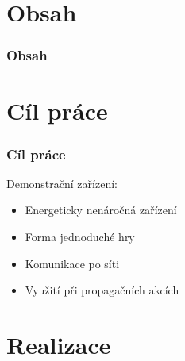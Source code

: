\documentclass{beamer}
\author[\FirstNameAbbreviated. \LastName]{\FirstName{} \LastName \\ {\color{mygray}\Email}}
\title{\DissertationTitle}
\institute[\FacultyAndUniversityAbbr]{\Department\\ \Faculty\\ \University \\[1em]}
\date{\today}
\begin{document}
{
\beamertemplatenavigationsymbolsempty
\begin{frame}[plain]
\maketitle
\end{frame}
\addtocounter{framenumber}{-1}
}
%
\section*{Obsah}
\begin{frame}[allowframebreaks]
\frametitle{Obsah}
\tableofcontents
\end{frame}

\section{Cíl práce}
\begin{frame}
\frametitle{Cíl práce}
Demonstrační zařízení:
\begin{itemize}
\item Energeticky nenáročná zařízení
\item Forma jednoduché hry
\item Komunikace po síti 
\item Využití při propagačních akcích
\end{itemize}
\end{frame}

\section{Realizace}
\end{document}
